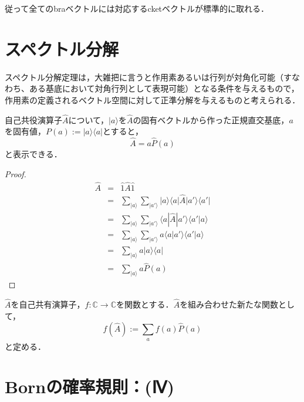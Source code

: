 \documentclass[uplatex, dvipdfmx]{jsreport}
\begin{document}
\begin{theorem}[Rieszの表現定理]
    
\end{theorem}
\begin{remark}
    従って全てのbraベクトルには対応するcketベクトルが標準的に取れる．
\end{remark}

\section{スペクトル分解}

スペクトル分解定理は，大雑把に言うと作用素あるいは行列が対角化可能（すなわち、ある基底において対角行列として表現可能）となる条件を与えるもので，作用素の定義されるベクトル空間に対して正準分解を与えるものと考えられる．
\begin{proposition}
    自己共役演算子$\hat{A}$について，$|a\rangle$を$\hat{A}$の固有ベクトルから作った正規直交基底，$a$を固有値，$P(a):=|a\rangle\langle a|$とすると，
    \[ \hat{A} = a\hat{P}(a) \]
    と表示できる．
\end{proposition}
\begin{proof}
    \begin{eqnarray*}
        \hat{A} &=& \hat{1}\hat{A}\hat{1} \\
        &=& \sum_{|a\rangle}\sum_{|a'\rangle}|a\rangle\langle a| \hat{A} |a'\rangle\langle a'| \\
        &=& \sum_{|a\rangle}\sum_{|a'\rangle}\langle a| \hat{A} |a'\rangle\langle a'|a\rangle \\
        &=& \sum_{|a\rangle}\sum_{|a'\rangle}a\langle a |a'\rangle\langle a'|a\rangle \\
        &=& \sum_{|a\rangle} a|a\rangle\langle a| \\
        &=& \sum_{|a\rangle} a\hat{P}(a)
    \end{eqnarray*}
\end{proof}

\begin{definition}[スペクトル分解可能な作用素に対する関数]
    $\hat{A}$を自己共有演算子，$f:\mathbb{C}\to\mathbb{C}$を関数とする．$\hat{A}$を組み合わせた新たな関数として，
    \[f(\hat{A}):=\sum_af(a)\hat{P}(a)\]
    と定める．
\end{definition}

\section{Bornの確率規則：(Ⅳ)}
\end{document}
